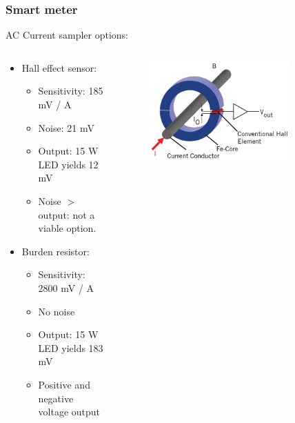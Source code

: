 \documentclass{beamer}
\begin{document}
	\begin{frame}\frametitle{Smart meter}

		AC Current sampler options:

		\begin{columns}
			\begin{column}{0.48\textwidth}

				\begin{itemize}
					\item Hall effect sensor:

					\begin{itemize}
						\item Sensitivity: 185 mV / A
						\item Noise: 21 mV
						\item Output: 15 W LED yields 12 mV 
						\item Noise $>$ output: not a viable option.
					\end{itemize}

					\item Burden resistor:

					\begin{itemize}
						\item Sensitivity: 2800 mV / A
						\item No noise 
						\item Output: 15 W LED yields 183 mV 
						\item Positive and negative voltage output %
					\end{itemize}


				\end{itemize}
			\end{column}
			\begin{column}{0.48\textwidth}

				\begin{figure}
					\centering
					\includegraphics[width=0.8\textwidth]{hall-effect-sensing}
				\end{figure}

			\end{column}
		\end{columns}


		

		
		
	\end{frame}
\end{document}
